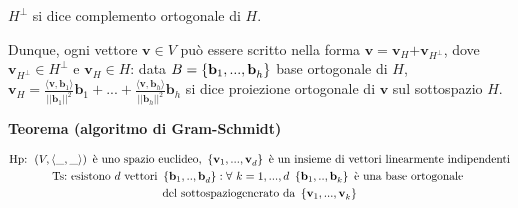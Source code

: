 \documentclass{article}
\begin{document}
$H^{\perp }$ si dice complemento ortogonale di $H$.

Dunque, ogni vettore $\mathbf{v}\in V$ pu\`{o} essere scritto nella forma $%
\mathbf{v=v}_{H}\mathbf{+v}_{H^{\perp }}$, dove $\mathbf{v}_{H^{\perp }}\in
H^{\perp }$ e $\mathbf{v}_{H}\in H$: data $B=\left\{ \mathbf{b}_{1}\mathbf{%
,...,b}_{h}\right\} $ base ortogonale di $H$, $\mathbf{v}_{H}=\frac{\langle 
\mathbf{v},\mathbf{b}_{1}\rangle }{\left\vert \left\vert \mathbf{b}%
_{1}\right\vert \right\vert ^{2}}\mathbf{b}_{1}+...+\frac{\langle \mathbf{v},%
\mathbf{b}_{h}\rangle }{\left\vert \left\vert \mathbf{b}_{h}\right\vert
\right\vert ^{2}}\mathbf{b}_{h}$ si dice proiezione ortogonale di $\mathbf{v}
$ sul sottospazio $H$.

\textbf{Teorema (algoritmo di Gram-Schmidt)}

\begin{gather*}
\text{Hp}\text{: }\left( V,\langle \_,\_\mathbf{\rangle }\right) \text{ \`{e}
uno spazio euclideo, }\left\{ \mathbf{v}_{1}\mathbf{,...,v}_{d}\right\} 
\text{ \`{e} un insieme di vettori linearmente indipendenti} \\
\text{Ts}\text{:}\text{ esistono }d\text{ vettori }\left\{ \mathbf{b}_{1}%
\mathbf{,..,b}_{d}\right\} :\forall \text{ }k=1,...,d\text{ }\left\{ \mathbf{%
b}_{1}\mathbf{,..,b}_{k}\right\} \text{ \`{e} una base ortogonale } \\
\text{del sottospazio}\text{generato da }\left\{ \mathbf{v}_{1}\mathbf{,...,v%
}_{k}\right\}
\end{gather*}
\end{document}
